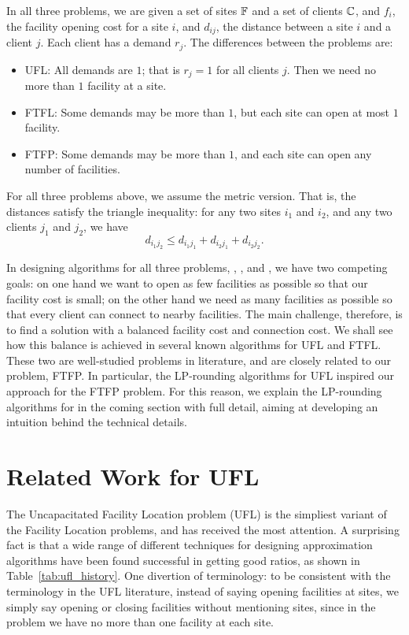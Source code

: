 \documentclass[oneside,final]{ucr}
\begin{document}
In all three problems, we are given a set of sites
$\mathbb{F}$ and a set of clients $\mathbb{C}$, and $f_i$,
the facility opening cost for a site $i$, and $d_{ij}$, the
distance between a site $i$ and a client $j$. Each client
has a demand $r_j$. The differences between the problems
are:
\begin{itemize}
\item{UFL}: All demands are $1$; that is $r_j=1$ for
  all clients $j$. Then we need no more than $1$ facility at
  a site.
\item{FTFL}: Some demands may be more than $1$, but
  each site can open at most $1$ facility.
\item{FTFP}: Some demands may be more than $1$, and each site
  can open any number of facilities.
\end{itemize}
For all three problems above, we assume the metric
version. That is, the distances satisfy the triangle
inequality: for any two sites $i_1$ and $i_2$, and any two
clients $j_1$ and $j_2$, we have
\begin{equation*}
  d_{i_1 j_2} \leq d_{i_1 j_1} + d_{i_2 j_1} + d_{i_2 j_2}.
\end{equation*}

In designing algorithms for all three problems, {\UFL},
{\FTFL}, and {\FTFP}, we have two competing goals: on one
hand we want to open as few facilities as possible so that
our facility cost is small; on the other hand we need as
many facilities as possible so that every client can connect
to nearby facilities. The main challenge, therefore, is to
find a solution with a balanced facility cost and connection
cost. We shall see how this balance is achieved in several
known algorithms for UFL and FTFL. These two are
well-studied problems in literature, and are closely related
to our problem, FTFP. In particular, the LP-rounding
algorithms for UFL inspired our approach for the FTFP
problem. For this reason, we explain the LP-rounding
algorithms for {\UFL} in the coming section with full
detail, aiming at developing an intuition behind the
technical details.

\section{Related Work for UFL}
The Uncapacitated Facility Location problem (UFL) is the
simpliest variant of the Facility Location problems, and has
received the most attention. A surprising fact is that a
wide range of different techniques for designing
approximation algorithms have been found successful in
getting good ratios, as shown in
Table~\ref{tab:ufl_history}. One divertion of terminology:
to be consistent with the terminology in the UFL literature,
instead of saying opening facilities at sites, we simply say
opening or closing facilities without mentioning sites,
since in the {\UFL} problem we have no more than one
facility at each site.
\end{document}
